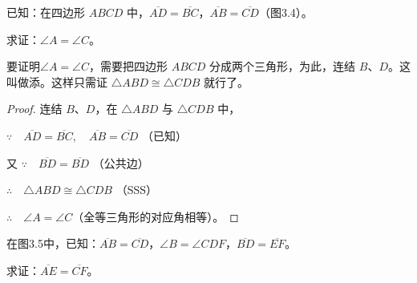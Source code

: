 \begin{figure}
  \begin{minipage}[b]{0.48\linewidth}
    \centering
{}
    \caption{}
  \end{minipage}
  \begin{minipage}[b]{0.48\linewidth}
    \centering
    \caption{}\label{fig:3-3}
  \end{minipage}
\end{figure}


\begin{example}
已知：在四边形 $ABCD$ 中，$\overline{AD}=\overline{BC}$，$\overline{AB}=\overline{CD}$（图3.4）。

求证：$\angle A=\angle C$。
\end{example}

\begin{analyze}
要证明$\angle A=\angle C$，需要把四边形 $ABCD$ 分成两个三角形，为此，连结 $B$、$D$。这叫做添。这样只需证 $\triangle ABD\cong \triangle CDB$ 就行了。
\end{analyze}

\begin{proof}
连结 $B$、$D$，在 $\triangle ABD$ 与 $\triangle CDB$ 中，

$\because\quad \overline{AD}=\overline{BC},\quad \overline{AB}=\overline{CD}$ （已知）

又 $\because\quad \overline{BD}=\overline{BD}$ （公共边）

$\therefore\quad \triangle ABD\cong \triangle CDB$ （SSS）

$\therefore\quad \angle A=\angle C$（全等三角形的对应角相等）。
\end{proof}    

\begin{example}
在图3.5中，已知：$\overline{AB}=\overline{CD}$，$\angle B=\angle CDF$，$\overline{BD}=\overline{EF}$。

求证：$\overline{AE}=\overline{CF}$。
\end{example}

